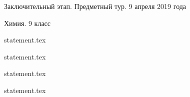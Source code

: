 \documentclass[a4paper,11pt, oneside]{book}
\begin{document}
\vspace{-3mm}
\vspace{-5mm}

\normalsize

\begin{center}
    Заключительный этап. Предметный тур. 9 апреля 2019 года
    
    Химия. 9 класс
\end{center}

\parindent=0cm

{statement.tex}

\clearpage

{statement.tex}

{statement.tex}

\clearpage

{statement.tex}
\end{document}
